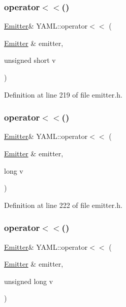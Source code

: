 \subsubsection{\texorpdfstring{operator$<$$<$()}{operator<<()}\hspace{0.1cm}{\footnotesize\ttfamily [26/35]}}
{\footnotesize\ttfamily \mbox{\hyperlink{class_y_a_m_l_1_1_emitter}{Emitter}}\& Y\+A\+M\+L\+::operator$<$$<$ (\begin{DoxyParamCaption}\item[{\mbox{\hyperlink{class_y_a_m_l_1_1_emitter}{Emitter}} \&}]{emitter,  }\item[{unsigned short}]{v }\end{DoxyParamCaption})\hspace{0.3cm}{\ttfamily [inline]}}



Definition at line 219 of file emitter.\+h.

\mbox{\label{namespace_y_a_m_l_a5a806c7b075726b0fd98d41da23c8c52}} 
\subsubsection{\texorpdfstring{operator$<$$<$()}{operator<<()}\hspace{0.1cm}{\footnotesize\ttfamily [27/35]}}
{\footnotesize\ttfamily \mbox{\hyperlink{class_y_a_m_l_1_1_emitter}{Emitter}}\& Y\+A\+M\+L\+::operator$<$$<$ (\begin{DoxyParamCaption}\item[{\mbox{\hyperlink{class_y_a_m_l_1_1_emitter}{Emitter}} \&}]{emitter,  }\item[{long}]{v }\end{DoxyParamCaption})\hspace{0.3cm}{\ttfamily [inline]}}



Definition at line 222 of file emitter.\+h.

\mbox{\label{namespace_y_a_m_l_a04607f25a393772530e117f6c6fca15d}} 
\subsubsection{\texorpdfstring{operator$<$$<$()}{operator<<()}\hspace{0.1cm}{\footnotesize\ttfamily [28/35]}}
{\footnotesize\ttfamily \mbox{\hyperlink{class_y_a_m_l_1_1_emitter}{Emitter}}\& Y\+A\+M\+L\+::operator$<$$<$ (\begin{DoxyParamCaption}\item[{\mbox{\hyperlink{class_y_a_m_l_1_1_emitter}{Emitter}} \&}]{emitter,  }\item[{unsigned long}]{v }\end{DoxyParamCaption})\hspace{0.3cm}{\ttfamily [inline]}}



